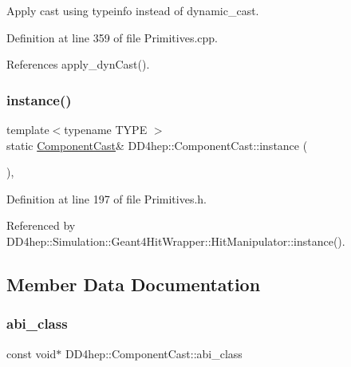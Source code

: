 Apply cast using typeinfo instead of dynamic\+\_\+cast. 



Definition at line 359 of file Primitives.\+cpp.



References apply\+\_\+dyn\+Cast().

\hypertarget{class_d_d4hep_1_1_component_cast_a006ce4ac1df92fed1bf93fbe95227262}{}\label{class_d_d4hep_1_1_component_cast_a006ce4ac1df92fed1bf93fbe95227262} 
\subsubsection{\texorpdfstring{instance()}{instance()}}
{\footnotesize\ttfamily template$<$typename T\+Y\+PE $>$ \\
static \hyperlink{class_d_d4hep_1_1_component_cast}{Component\+Cast}\& D\+D4hep\+::\+Component\+Cast\+::instance (\begin{DoxyParamCaption}{ }\end{DoxyParamCaption})\hspace{0.3cm}{\ttfamily [inline]}, {\ttfamily [static]}}



Definition at line 197 of file Primitives.\+h.



Referenced by D\+D4hep\+::\+Simulation\+::\+Geant4\+Hit\+Wrapper\+::\+Hit\+Manipulator\+::instance().



\subsection{Member Data Documentation}
\hypertarget{class_d_d4hep_1_1_component_cast_ae8cce3fcc69745f330272a49d51024dd}{}\label{class_d_d4hep_1_1_component_cast_ae8cce3fcc69745f330272a49d51024dd} 
\subsubsection{\texorpdfstring{abi\+\_\+class}{abi\_class}}
{\footnotesize\ttfamily const void$\ast$ D\+D4hep\+::\+Component\+Cast\+::abi\+\_\+class}



